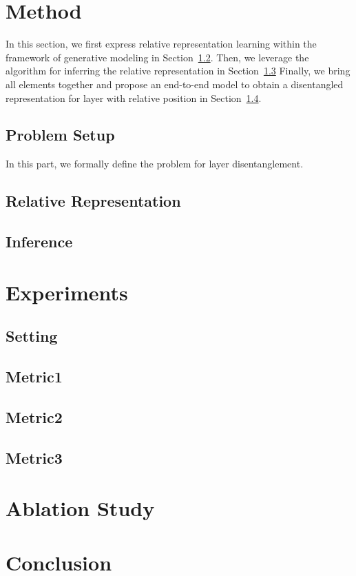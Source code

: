 \section{Method}
In this section, we first express relative representation learning within the framework of generative modeling in Section~\ref{sec:relative_representation}.
Then, we leverage the algorithm for inferring the relative representation in Section~\ref{sec:inference} 
Finally, we bring all elements together and propose an end-to-end model to obtain a disentangled representation for layer with relative position in Section~\ref{sec:model}.

\subsection{Problem Setup}
In this part, we formally define the problem for layer disentanglement.






\subsection{Relative Representation}\label{sec:relative_representation}

\subsection{Inference}\label{sec:inference}

\subsection{}\label{sec:model}

\section{Experiments}

\subsection{Setting}

 

 

\subsection{Metric1}
\subsection{Metric2}
\subsection{Metric3}


\section{Ablation Study}


\section{Conclusion}

